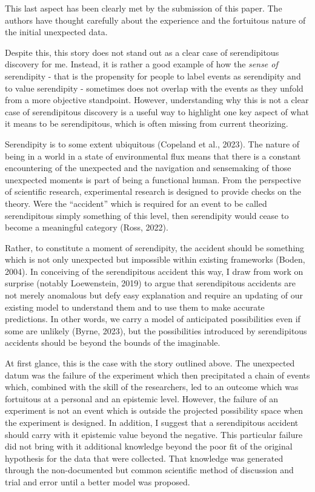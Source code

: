\documentclass[authordate, commentary]{jote-new-article}
\begin{document}
	This last aspect has been clearly met by the submission of this paper. The authors have thought carefully about the experience and the fortuitous nature of the initial unexpected data.



	Despite this, this story does not stand out as a clear case of serendipitous discovery for me. Instead, it is rather a good example of how the \emph{sense of} serendipity - that is the propensity for people to label events as serendipity and to value serendipity - sometimes does not overlap with the events as they unfold from a more objective standpoint. However, understanding why this is not a clear case of serendipitous discovery is a useful way to highlight one key aspect of what it means to be serendipitous, which is often missing from current theorizing.

 

    Serendipity is to some extent ubiquitous (Copeland et al., 2023). The nature of being in a world in a state of environmental flux means that there is a constant encountering of the unexpected and the navigation and sensemaking of those unexpected moments is part of being a functional human. From the perspective of scientific research, experimental research is designed to provide checks on the theory. Were the “accident” which is required for an event to be called serendipitous simply something of this level, then serendipity would cease to become a meaningful category (Ross, 2022). 



	Rather, to constitute a moment of serendipity, the accident should be something which is not only unexpected but impossible within existing frameworks (Boden, 2004). In conceiving of the serendipitous accident this way, I draw from work on surprise (notably Loewenstein, 2019) to argue that serendipitous accidents are not merely anomalous but defy easy explanation and require an updating of our existing model to understand them and to use them to make accurate predictions. In other words, we carry a model of anticipated possibilities even if some are unlikely (Byrne, 2023), but the possibilities introduced by serendipitous accidents should be beyond the bounds of the imaginable. 



	At first glance, this is the case with the story outlined above. The unexpected datum was the failure of the experiment which then precipitated a chain of events which, combined with the skill of the researchers, led to an outcome which was fortuitous at a personal and an epistemic level. However, the failure of an experiment is not an event which is outside the projected possibility space when the experiment is designed. In addition, I suggest that a serendipitous accident should carry with it epistemic value beyond the negative. This particular failure did not bring with it additional knowledge beyond the poor fit of the original hypothesis for the data that were collected. That knowledge was generated through the non-documented but common scientific method of discussion and trial and error until a better model was proposed.
\end{document}
